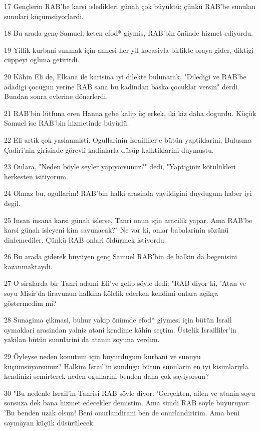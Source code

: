 \par 17 Gençlerin RAB'be karsi isledikleri günah çok büyüktü; çünkü RAB'be sunulan sunulari küçümsüyorlardi.
\par 18 Bu arada genç Samuel, keten efod* giymis, RAB'bin önünde hizmet ediyordu.
\par 19 Yillik kurbani sunmak için annesi her yil kocasiyla birlikte oraya gider, diktigi cüppeyi ogluna getirirdi.
\par 20 Kâhin Eli de, Elkana ile karisina iyi dilekte bulunarak, "Diledigi ve RAB'be adadigi çocugun yerine RAB sana bu kadindan baska çocuklar versin" derdi. Bundan sonra evlerine dönerlerdi.
\par 21 RAB'bin lütfuna eren Hanna gebe kalip üç erkek, iki kiz daha dogurdu. Küçük Samuel ise RAB'bin hizmetinde büyüdü.
\par 22 Eli artik çok yaslanmisti. Ogullarinin Israilliler'e bütün yaptiklarini, Bulusma Çadiri'nin girisinde görevli kadinlarla düsüp kalktiklarini duymustu.
\par 23 Onlara, "Neden böyle seyler yapiyorsunuz?" dedi, "Yaptiginiz kötülükleri herkesten isitiyorum.
\par 24 Olmaz bu, ogullarim! RAB'bin halki arasinda yayildigini duydugum haber iyi degil.
\par 25 Insan insana karsi günah islerse, Tanri onun için aracilik yapar. Ama RAB'be karsi günah isleyeni kim savunacak?" Ne var ki, onlar babalarinin sözünü dinlemediler. Çünkü RAB onlari öldürmek istiyordu.
\par 26 Bu arada giderek büyüyen genç Samuel RAB'bin de halkin da begenisini kazanmaktaydi.
\par 27 O siralarda bir Tanri adami Eli'ye gelip söyle dedi: "RAB diyor ki, 'Atan ve soyu Misir'da firavunun halkina kölelik ederken kendimi onlara açikça göstermedim mi?
\par 28 Sunagima çikmasi, buhur yakip önümde efod* giymesi için bütün Israil oymaklari arasindan yalniz atani kendime kâhin seçtim. Üstelik Israilliler'in yakilan bütün sunularini da atanin soyuna verdim.
\par 29 Öyleyse neden konutum için buyurdugum kurbani ve sunuyu küçümsüyorsunuz? Halkim Israil'in sundugu bütün sunularin en iyi kisimlariyla kendinizi semirterek neden ogullarini benden daha çok sayiyorsun?
\par 30 "Bu nedenle Israil'in Tanrisi RAB söyle diyor: 'Gerçekten, ailen ve atanin soyu sonsuza dek bana hizmet edecekler demistim. Ama simdi RAB söyle buyuruyor: 'Bu benden uzak olsun! Beni onurlandirani ben de onurlandiririm. Ama beni saymayan küçük düsürülecek.
